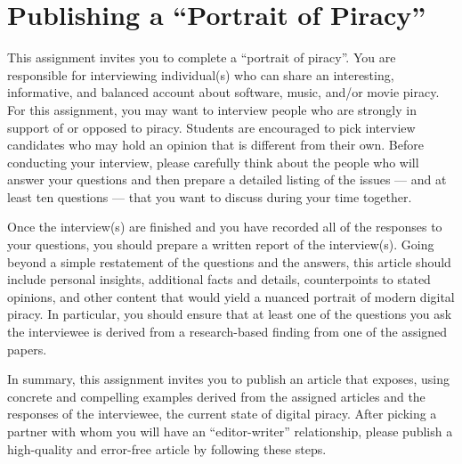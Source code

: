 \section*{Publishing a ``Portrait of Piracy''}

This assignment invites you to complete a ``portrait of piracy''. You are responsible for interviewing individual(s) who
can share an interesting, informative, and balanced account about software, music, and/or movie piracy. For this
assignment, you may want to interview people who are strongly in support of or opposed to piracy. Students are
encouraged to pick interview candidates who may hold an opinion that is different from their own. Before conducting your
interview, please carefully think about the people who will answer your questions and then prepare a detailed listing of
the issues --- and at least ten questions --- that you want to discuss during your time together.

Once the interview(s) are finished and you have recorded all of the responses to your questions, you should prepare a
written report of the interview(s). Going beyond a simple restatement of the questions and the answers, this article
should include personal insights, additional facts and details, counterpoints to stated opinions, and other content that
would yield a nuanced portrait of modern digital piracy. In particular, you should ensure that at least one of the
questions you ask the interviewee is derived from a research-based finding from one of the assigned papers.

In summary, this assignment invites you to publish an article that exposes, using concrete and compelling examples
derived from the assigned articles and the responses of the interviewee, the current state of digital piracy. After
picking a partner with whom you will have an ``editor-writer'' relationship, please publish a high-quality and
error-free article by following these steps.

\vspace*{-.1in}

